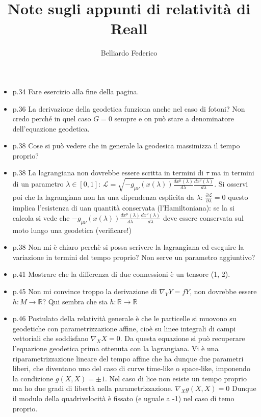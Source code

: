 \documentclass[10pt,a4paper]{article}
\author{Belliardo Federico}
\title{Note sugli appunti di relatività di Reall}
\begin{document}
\maketitle

\begin{itemize}

\item p.34 Fare esercizio alla fine della pagina.
\item p.36 La derivazione della geodetica funziona anche nel caso di fotoni? Non credo perché in quel caso $G = 0$ sempre e on può stare a denominatore dell'equazione geodetica.
\item p.38 Cose si può vedere che in generale la geodesica massimizza il tempo proprio?
\item p.38 La lagrangiana non dovrebbe essere scritta in termini di $\tau$ ma in termini di un parametro $\lambda \in [0, 1]$: $\mathcal{L} = \sqrt{-g_{\mu \nu}(x(\lambda)) \frac{d x^{\mu} (\lambda)}{d \lambda}  \frac{d x^{\nu} (\lambda)}{d \lambda}}$. Si osservi poi che la lagrangiana non ha una dipendenza esplicita da $\lambda$: $\frac{\partial \mathcal{L}}{\partial \lambda} = 0$ questo implica l'esistenza di uan quantità conservata (l'Hamiltoniana): se la si calcola si vede che $-g_{\mu \nu}(x(\lambda)) \frac{d x^{\mu} (\lambda)}{d \lambda}  \frac{d x^{\nu} (\lambda)}{d \lambda}$ deve essere conservata sul moto lungo una geodetica (verificare!)
\item p.38 Non mi è chiaro perchè si possa scrivere la lagrangiana ed eseguire la variazione in termini del tempo proprio? Non serve un parametro aggiuntivo?
\item p.41 Mostrare che la differenza di due connessioni è un tensore (1, 2).
\item p.45 Non mi convince troppo la derivazione di $\nabla_{Y}  Y = fY$, non dovrebbe essere $h:M \rightarrow \mathbb{R}$? Qui sembra che sia  $h:\mathbb{R} \rightarrow \mathbb{R}$
\item p.46 Postulato della relatività generale è che le particelle si muovono su geodetiche con parametrizzazione affine, cioè su linee integrali di campi vettoriali che soddisfano $\nabla_{X} X = 0$. Da questa equazione si può recuperare l'equazione geodetica prima ottenuta con la lagrangiana. Vi è una riparametrizzazione lineare del tempo affine che ha dunque due parametri liberi, che diventano uno del caso di curve time-like o space-like, imponendo la condizione $g(X, X) = \pm 1$. Nel caso di lice non esiste un tempo proprio ma ho due gradi di libertà nella parametrizzazione. $\nabla_{X} g(X, X) = 0$ Dunque il modulo della quadrivelocità è fissato (e uguale a -1) nel caso di temo proprio. 

\end{itemize}
\end{document}
